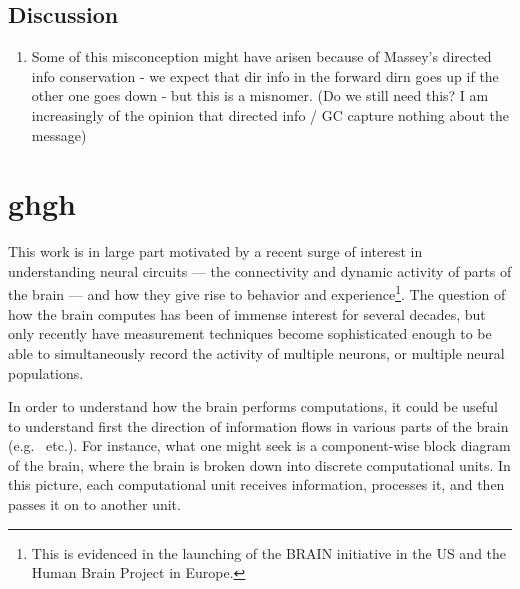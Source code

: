 \documentclass[conference]{IEEEtran}
\begin{document}
\subsection{Discussion}
\begin{enumerate}
	\item Some of this misconception might have arisen because of Massey's directed info conservation - we expect that dir info in the forward dirn goes up if the other one goes down - but this is a misnomer. (Do we still need this? I am increasingly of the opinion that directed info / GC capture nothing about the message)
\end{enumerate}

\section{ghgh}

This work is in large part motivated by a recent surge of interest in understanding neural circuits --- the connectivity and dynamic activity of parts of the brain --- and how they give rise to behavior and experience\footnote{This is evidenced in the launching of the BRAIN initiative in the US and the Human Brain Project in Europe.}. The question of how the brain computes has been of immense interest for several decades, but only recently have measurement techniques become sophisticated enough to be able to simultaneously record the activity of multiple neurons, or multiple neural populations.

In order to understand how the brain performs computations, it could be useful to understand first the direction of information flows  in various parts of the brain (e.g.~\cite{blinowska2004granger,dhamala2008analyzing,nolte2008robustly,korzeniewska2003determination,schippers2010mapping} etc.). For instance, what one might seek is a component-wise block diagram of the brain, where the brain is broken down into discrete computational units. In this picture, each computational unit receives information, processes it, and then passes it on to another unit.
\end{document}
